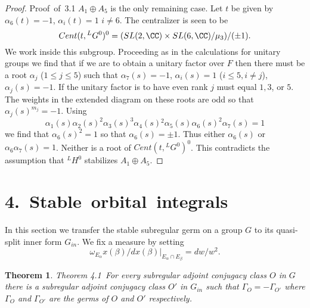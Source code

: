 \documentclass{memo-l}
\newtheorem{theorem}{Theorem}[section]
\theoremstyle{definition}
\theoremstyle{remark}
\numberwithin{section}{chapter}
\numberwithin{equation}{chapter}
\begin{document}
\begin{proof} {Proof\ of\ 3.1}
   $A_{1}\oplus A_{5}$ is the only remaining case.  Let $t$ be given by
${\alpha}_{6}(t) = -1$, ${\alpha}_{i}(t) = 1$ $i \ne 6$.  The centralizer is seen to
be
$$
Cent(t,{}^{L}G^{0})^{0}  =  (SL(2,{\CC}) \times 
SL(6,{\CC})/{\mu}_{3})/({\pm}1).
$$
We work inside this subgroup.  Proceeding as in the calculations for
unitary groups we find that if we are to obtain a unitary factor over $F$
then there must be a root ${\alpha}_{j}$ ($1 \le  j \le  5$) such that
${\alpha}_{7}(s)  =  -1$, ${\alpha}_{i}(s)  =  1$ ($i \le  5, i \ne j$),
${\alpha}_{j}(s)  =  -1$.  If the unitary factor is to have even rank $j$ must
equal $1, 3$, or $5$.  The weights in the extended diagram on these roots
are odd so that ${\alpha}_{j}(s)^{m_{j}} =  -1$.  Using
$$
{\alpha}_{1}(s){\alpha}_{2}(s)^{2}{\alpha}_{3}(s)^{3}
{\alpha}_{4}(s){}^{2}{\alpha}_5(s)\alpha_6(s)^2\alpha_7(s)=1
$$
we find that ${\alpha}_{6}(s)^{2}  =  1$ so that ${\alpha}_{6}(s)  = 
{\pm}1$.  Thus either ${\alpha}_{6}(s)$ or ${\alpha}_{6}{\alpha}_{7}(s)
 =  1$.  Neither is a root of $Cent(t,{}^{L}G^{0})^{0}$.  This contradicts the
assumption that ${}^{L}H^{0}$ stabilizes $A_{1}\oplus A_{5}$.
\end{proof} 


\section{4.\  Stable\ orbital\ integrals}


   In this section we transfer the stable subregular germ on a group $G$ to its
quasi-split inner form $G_{in}$.  We fix a measure by setting
$$
{\omega}_{E_\alpha} x({\beta})/dx({\beta})\vert_{E_{{\alpha}} {\cap}
E_{{\beta}}}  =  dw/w^{2}.
$$

\medpagebreak

\begin{theorem}{Theorem 4.1}\ For every subregular adjoint conjugacy class
$O$ in $G$ there is a subregular adjoint conjugacy class $O'$ in $G_{in}$
such that ${\Gamma}_{O}  =  -{\Gamma}_{O'}$ where ${\Gamma}_{O}$ and
${\Gamma}_{O'}$ are the germs of $O$ and $O'$ respectively.
\end{theorem}
\end{document}

